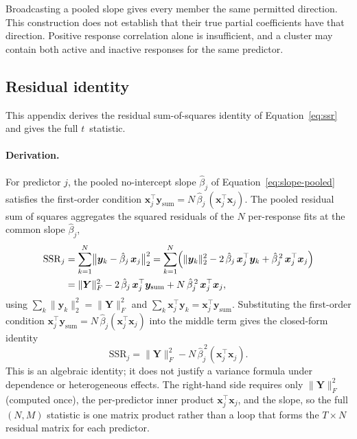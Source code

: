 \documentclass[11pt,a4paper]{article}
\begin{document}
Broadcasting a pooled slope gives every member the same permitted direction.
This construction does not establish that their true partial coefficients have
that direction. Positive response correlation alone is insufficient, and a
cluster may contain both active and inactive responses for the same predictor.


\subsection{Residual identity}


This appendix derives the residual sum-of-squares identity of
Equation~\eqref{eq:ssr} and gives the full $t$~statistic.

\paragraph{Derivation.}
For predictor $j$, the pooled no-intercept slope $\hat{\beta}_j$ of
Equation~\eqref{eq:slope-pooled} satisfies the first-order condition
$\bm{x}_j^\top \bm{y}_{\mathrm{sum}} = N\, \hat{\beta}_j\, (\bm{x}_j^\top \bm{x}_j)$.
The pooled residual sum of squares aggregates the squared residuals of the $N$
per-response fits at the common slope $\hat{\beta}_j$,
%
\begin{align}
	\mathrm{SSR}_j
	&= \sum_{k=1}^{N} \bigl\| \bm{y}_k - \hat{\beta}_j\, \bm{x}_j \bigr\|_2^2
	= \sum_{k=1}^{N} \Bigl( \|\bm{y}_k\|_2^2
	- 2\, \hat{\beta}_j\, \bm{x}_j^\top \bm{y}_k
	+ \hat{\beta}_j^{\,2}\, \bm{x}_j^\top \bm{x}_j \Bigr) \notag \\
	&= \|\bm{Y}\|_F^2
	- 2\, \hat{\beta}_j\, \bm{x}_j^\top \bm{y}_{\mathrm{sum}}
	+ N\, \hat{\beta}_j^{\,2}\, \bm{x}_j^\top \bm{x}_j , \label{eq:ssr-expand}
\end{align}
%
using $\sum_k \|\bm{y}_k\|_2^2 = \|\bm{Y}\|_F^2$ and
$\sum_k \bm{x}_j^\top \bm{y}_k = \bm{x}_j^\top \bm{y}_{\mathrm{sum}}$.
Substituting the first-order condition
$\bm{x}_j^\top \bm{y}_{\mathrm{sum}} = N\, \hat{\beta}_j (\bm{x}_j^\top \bm{x}_j)$
into the middle term gives the closed-form identity
\begin{equation}\label{eq:ssr}
\mathrm{SSR}_j = \|\bm{Y}\|_F^2 - N\,\hat\beta_j^{\,2}
(\bm{x}_j^\top\bm{x}_j).
\end{equation}
This is an algebraic identity; it does not justify a variance formula under
dependence or heterogeneous effects.
The right-hand side requires only $\|\bm{Y}\|_F^2$ (computed once), the
per-predictor inner product $\bm{x}_j^\top \bm{x}_j$, and the slope, so the full
$(N, M)$ statistic is one matrix product rather than a loop that forms the
$T \times N$ residual matrix for each predictor.
\end{document}
